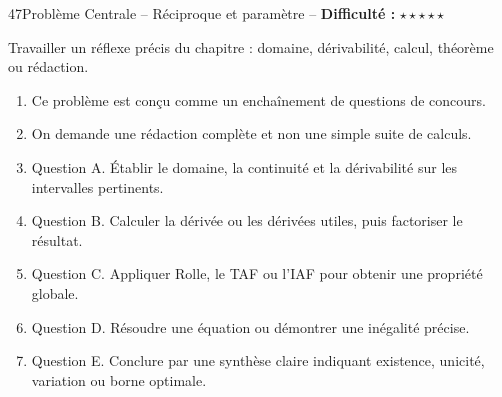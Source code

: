 \documentclass[11pt,a4paper]{article}
\newcommand{\etoiles}[1]{\textbf{Difficulté :} #1}
\begin{document}
\begin{exobox}{47}{Problème Centrale -- Réciproque et paramètre -- \etoiles{$\star\star\star\star\star$}}

\begin{objectifbox}
Travailler un réflexe précis du chapitre : domaine, dérivabilité, calcul, théorème ou rédaction.
\end{objectifbox}

\begin{enumerate}

\item Ce problème est conçu comme un enchaînement de questions de concours.

\item On demande une rédaction complète et non une simple suite de calculs.

\item Question A. Établir le domaine, la continuité et la dérivabilité sur les intervalles pertinents.

\item Question B. Calculer la dérivée ou les dérivées utiles, puis factoriser le résultat.

\item Question C. Appliquer Rolle, le TAF ou l'IAF pour obtenir une propriété globale.

\item Question D. Résoudre une équation ou démontrer une inégalité précise.

\item Question E. Conclure par une synthèse claire indiquant existence, unicité, variation ou borne optimale.

\end{enumerate}

\end{exobox}
\end{document}
